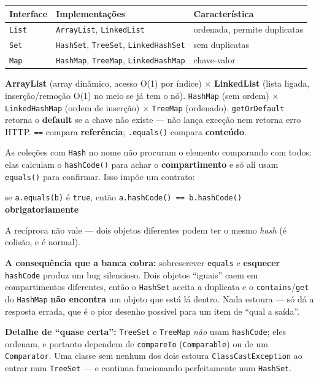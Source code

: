 \begin{center}
\begin{tabular}{@{}p{2.2cm}p{3.8cm}p{4cm}@{}}
\toprule
\textbf{Interface} & \textbf{Implementações} & \textbf{Característica} \\
\midrule
\texttt{List} & \texttt{ArrayList}, \texttt{LinkedList} & ordenada, permite duplicatas \\
\texttt{Set} & \texttt{HashSet}, \texttt{TreeSet}, \texttt{LinkedHashSet} & sem duplicatas \\
\texttt{Map} & \texttt{HashMap}, \texttt{TreeMap}, \texttt{LinkedHashMap} & chave-valor \\
\bottomrule
\end{tabular}
\end{center}

\textbf{ArrayList} (array dinâmico, acesso O(1) por índice) $\times$
\textbf{LinkedList} (lista ligada, inserção/remoção O(1) no meio se já tem o
nó). \texttt{HashMap} (sem ordem) $\times$ \texttt{LinkedHashMap} (ordem de
inserção) $\times$ \texttt{TreeMap} (ordenado). \texttt{getOrDefault} retorna
o \textbf{default} se a chave não existe --- não lança exceção nem retorna
erro HTTP. \texttt{==} compara \textbf{referência}; \texttt{.equals()}
compara \textbf{conteúdo}.

\begin{conceito}
As coleções com \texttt{Hash} no nome não procuram o elemento comparando com
todos: elas calculam o \texttt{hashCode()} para achar o \textbf{compartimento}
e só ali usam \texttt{equals()} para confirmar. Isso impõe um contrato:

\begin{center}
se \texttt{a.equals(b)} é \texttt{true}, então
\texttt{a.hashCode() == b.hashCode()} \textbf{obrigatoriamente}
\end{center}

A recíproca não vale --- dois objetos diferentes podem ter o mesmo
\emph{hash} (é colisão, e é normal).

\textbf{A consequência que a banca cobra:} sobrescrever \texttt{equals} e
\textbf{esquecer} \texttt{hashCode} produz um bug silencioso. Dois objetos
``iguais'' caem em compartimentos diferentes, então o \texttt{HashSet} aceita a
duplicata e o \texttt{contains}/\texttt{get} do \texttt{HashMap}
\textbf{não encontra} um objeto que está lá dentro. Nada estoura --- só dá a
resposta errada, que é o pior desenho possível para um item de ``qual a saída''.

\textbf{Detalhe de ``quase certa'':} \texttt{TreeSet} e \texttt{TreeMap}
\emph{não} usam \texttt{hashCode}; eles ordenam, e portanto dependem de
\texttt{compareTo} (\texttt{Comparable}) ou de um \texttt{Comparator}. Uma
classe sem nenhum dos dois estoura \texttt{ClassCastException} ao entrar num
\texttt{TreeSet} --- e continua funcionando perfeitamente num \texttt{HashSet}.
\end{conceito}

